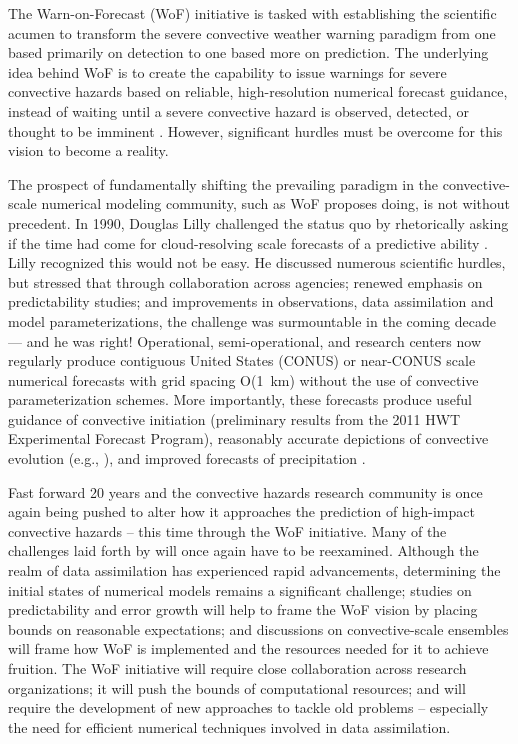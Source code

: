 


The Warn-on-Forecast (WoF) initiative is tasked with establishing the scientific acumen to transform the severe convective weather warning paradigm from one based primarily on detection to one based more on prediction. The underlying idea behind WoF is to create the capability to issue warnings for severe convective hazards based on reliable, high-resolution numerical forecast guidance, instead of waiting until a severe convective hazard is observed, detected, or thought to be imminent \citep{stensrud2009wof}. However, significant hurdles must be overcome for this vision to become a reality.


The prospect of fundamentally shifting the prevailing paradigm in the convective-scale numerical modeling community, such as WoF proposes doing, is not without precedent. In 1990, Douglas Lilly challenged the status quo by rhetorically asking if the time had come for cloud-resolving scale forecasts of a predictive ability \citep{lilly1990}. Lilly recognized this would not be easy. He discussed numerous scientific hurdles, but stressed that through collaboration across agencies; renewed emphasis on predictability studies; and improvements in observations, data assimilation and model parameterizations, the challenge was surmountable in the coming decade --- and he was right! Operational, semi-operational, and research centers now regularly produce contiguous United States (CONUS) or near-CONUS scale numerical forecasts with grid spacing \mbox{O(1 km)} without the use of convective parameterization schemes. More importantly, these forecasts produce useful guidance of convective initiation (preliminary results from the 2011 HWT Experimental Forecast Program), reasonably accurate depictions of convective evolution (e.g., \citealp{clark2012overview, clark2010mcv, clark2010verification, clark2009comparison, schwartz2009camresolution, kain2010attributes, kain2008camconsiderations, done2004cams}), and improved forecasts of precipitation \citep{novak2011qpf}.


Fast forward 20 years and the convective hazards research community is once again being pushed to alter how it approaches the prediction of high-impact convective hazards -- this time through the WoF initiative. Many of the challenges laid forth by \cite{lilly1990} will once again have to be reexamined. Although the realm of data assimilation has experienced rapid advancements, determining the initial states of numerical models remains a significant challenge; studies on predictability and error growth will help to frame the WoF vision by placing bounds on reasonable expectations; and discussions on convective-scale ensembles will frame how WoF is implemented and the resources needed for it to achieve fruition. The WoF initiative will require close collaboration across research organizations; it will push the bounds of computational resources; and will require the development of new approaches to tackle old problems -- especially the need for efficient numerical techniques involved in data assimilation.






